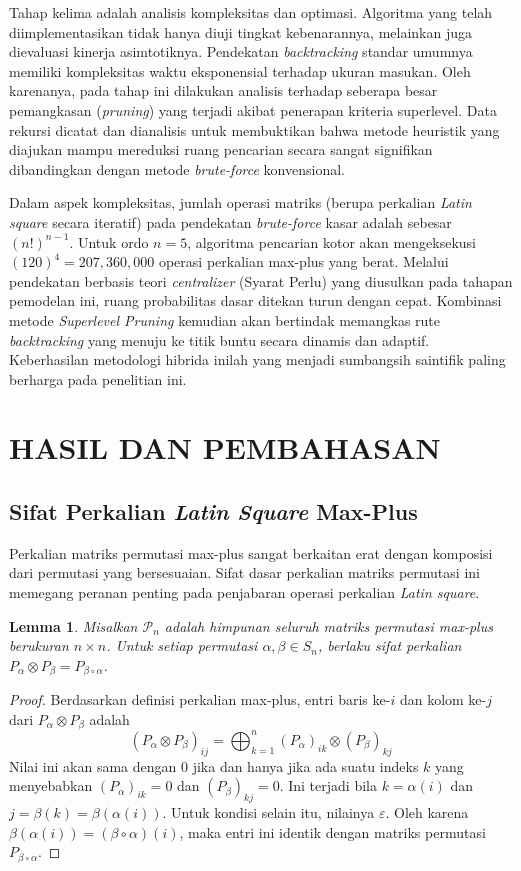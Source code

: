\documentclass[journal]{IEEEtran}
\newtheorem{lemma}{Lemma}
\theoremstyle{definition}
\theoremstyle{plain}
\begin{document}
Tahap kelima adalah analisis kompleksitas dan optimasi. Algoritma yang telah diimplementasikan tidak hanya diuji tingkat kebenarannya, melainkan juga dievaluasi kinerja asimtotiknya. Pendekatan \textit{backtracking} standar umumnya memiliki kompleksitas waktu eksponensial terhadap ukuran masukan. Oleh karenanya, pada tahap ini dilakukan analisis terhadap seberapa besar pemangkasan (\textit{pruning}) yang terjadi akibat penerapan kriteria superlevel. Data rekursi dicatat dan dianalisis untuk membuktikan bahwa metode heuristik yang diajukan mampu mereduksi ruang pencarian secara sangat signifikan dibandingkan dengan metode \textit{brute-force} konvensional.


Dalam aspek kompleksitas, jumlah operasi matriks (berupa perkalian \textit{Latin square} secara iteratif) pada pendekatan \textit{brute-force} kasar adalah sebesar $(n!)^{n-1}$. Untuk ordo $n=5$, algoritma pencarian kotor akan mengeksekusi $(120)^4 = 207,360,000$ operasi perkalian max-plus yang berat. Melalui pendekatan berbasis teori \textit{centralizer} (Syarat Perlu) yang diusulkan pada tahapan pemodelan ini, ruang probabilitas dasar ditekan turun dengan cepat. Kombinasi metode \textit{Superlevel Pruning} kemudian akan bertindak memangkas rute \textit{backtracking} yang menuju ke titik buntu secara dinamis dan adaptif. Keberhasilan metodologi hibrida inilah yang menjadi sumbangsih saintifik paling berharga pada penelitian ini.



\section{HASIL DAN PEMBAHASAN}
\subsection{Sifat Perkalian \textit{Latin Square} Max-Plus}
Perkalian matriks permutasi max-plus sangat berkaitan erat dengan komposisi dari permutasi yang bersesuaian. Sifat dasar perkalian matriks permutasi ini memegang peranan penting pada penjabaran operasi perkalian \textit{Latin square}.
\begin{lemma}
    Misalkan $\mathcal{P}_n$ adalah himpunan seluruh matriks permutasi max-plus berukuran $n \times n$. Untuk setiap permutasi $\alpha, \beta \in S_n$, berlaku sifat perkalian $P_\alpha \otimes P_\beta = P_{\beta \circ \alpha}$.
\end{lemma}

\begin{proof}
    Berdasarkan definisi perkalian max-plus, entri baris ke-$i$ dan kolom ke-$j$ dari $P_\alpha \otimes P_\beta$ adalah
    \[ (P_\alpha \otimes P_\beta)_{ij} = \bigoplus_{k=1}^n (P_\alpha)_{ik} \otimes (P_\beta)_{kj} \]
    Nilai ini akan sama dengan $0$ jika dan hanya jika ada suatu indeks $k$ yang menyebabkan $(P_\alpha)_{ik}=0$ dan $(P_\beta)_{kj}=0$. Ini terjadi bila $k=\alpha(i)$ dan $j=\beta(k)=\beta(\alpha(i))$. Untuk kondisi selain itu, nilainya $\varepsilon$. Oleh karena $\beta(\alpha(i)) = (\beta \circ \alpha)(i)$, maka entri ini identik dengan matriks permutasi $P_{\beta \circ \alpha}$.
\end{proof}
\end{document}
